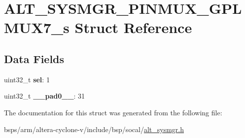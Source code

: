 \hypertarget{structALT__SYSMGR__PINMUX__GPLMUX7__s}{}\section{A\+L\+T\+\_\+\+S\+Y\+S\+M\+G\+R\+\_\+\+P\+I\+N\+M\+U\+X\+\_\+\+G\+P\+L\+M\+U\+X7\+\_\+s Struct Reference}
\label{structALT__SYSMGR__PINMUX__GPLMUX7__s}
\subsection*{Data Fields}
\begin{DoxyCompactItemize}
\item 
\mbox{\label{structALT__SYSMGR__PINMUX__GPLMUX7__s_a0f030b80823199b568df156b56f6f592}} 
uint32\+\_\+t {\bfseries sel}\+: 1
\item 
\mbox{\label{structALT__SYSMGR__PINMUX__GPLMUX7__s_a2ceacb9adfc26c38b208bb450f90bfb8}} 
uint32\+\_\+t {\bfseries \+\_\+\+\_\+pad0\+\_\+\+\_\+}\+: 31
\end{DoxyCompactItemize}


The documentation for this struct was generated from the following file\+:\begin{DoxyCompactItemize}
\item 
bsps/arm/altera-\/cyclone-\/v/include/bsp/socal/\mbox{\hyperlink{alt__sysmgr_8h}{alt\+\_\+sysmgr.\+h}}\end{DoxyCompactItemize}
